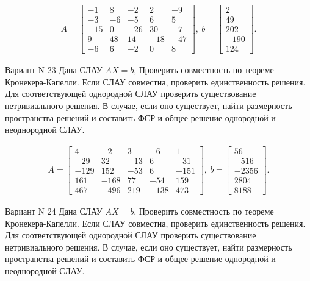 \documentclass[11pt]{report}
\begin{document}
\begin{align*}
 A = \left[\begin{matrix}-1 & 8 & -2 & 2 & -9\\-3 & -6 & -5 & 6 & 5\\-15 & 0 & -26 & 30 & -7\\9 & 48 & 14 & -18 & -47\\-6 & 6 & -2 & 0 & 8\end{matrix}\right],
\ b = \left[\begin{matrix}2\\49\\202\\-190\\124\end{matrix}\right]. 
 \end{align*}

Вариант N 23
Дана СЛАУ $AX = b$,
Проверить совместность по теореме Кронекера-Капелли. Если СЛАУ совместна, проверить единственность решения.
Для соответствующей однородной СЛАУ проверить существование нетривиального решения. В случае, если оно существует,
найти размерность пространства решений и составить ФСР и общее решение однородной  и неоднородной СЛАУ.


\begin{align*}
 A = \left[\begin{matrix}4 & -2 & 3 & -6 & 1\\-29 & 32 & -13 & 6 & -31\\-129 & 152 & -53 & 6 & -151\\161 & -168 & 77 & -54 & 159\\467 & -496 & 219 & -138 & 473\end{matrix}\right],
\ b = \left[\begin{matrix}56\\-516\\-2356\\2804\\8188\end{matrix}\right]. 
 \end{align*}

Вариант N 24
Дана СЛАУ $AX = b$,
Проверить совместность по теореме Кронекера-Капелли. Если СЛАУ совместна, проверить единственность решения.
Для соответствующей однородной СЛАУ проверить существование нетривиального решения. В случае, если оно существует,
найти размерность пространства решений и составить ФСР и общее решение однородной  и неоднородной СЛАУ.
\end{document}
